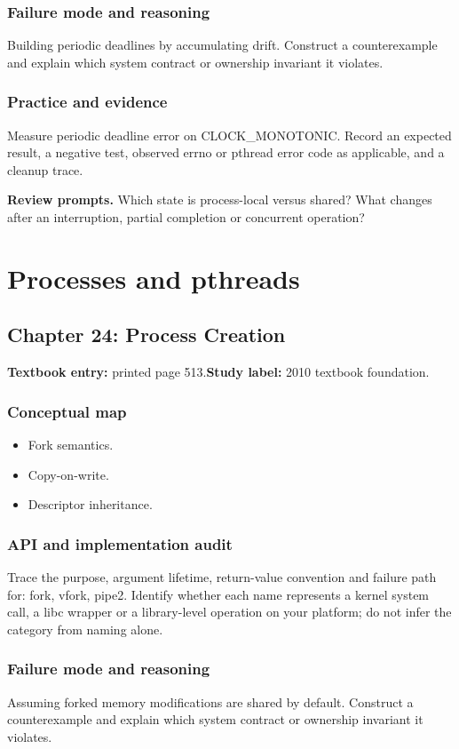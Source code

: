 \documentclass[11pt,letterpaper,oneside]{report}
\begin{document}
\subsection{Failure mode and reasoning}
Building periodic deadlines by accumulating drift. Construct a counterexample and explain which system contract or ownership invariant it violates.

\subsection{Practice and evidence}
Measure periodic deadline error on CLOCK\_MONOTONIC. Record an expected result, a negative test, observed errno or pthread error code as applicable, and a cleanup trace.

\textbf{Review prompts.} Which state is process-local versus shared? What changes after an interruption, partial completion or concurrent operation?

\chapter{Processes and pthreads}
\section{Chapter 24: Process Creation}
\textbf{Textbook entry:} printed page 513.\quad \textbf{Study label:} 2010 textbook foundation.

\subsection{Conceptual map}
\begin{itemize}
\item Fork semantics.
\item Copy-on-write.
\item Descriptor inheritance.
\end{itemize}
\subsection{API and implementation audit}
Trace the purpose, argument lifetime, return-value convention and failure path for: fork, vfork, pipe2. Identify whether each name represents a kernel system call, a libc wrapper or a library-level operation on your platform; do not infer the category from naming alone.

\subsection{Failure mode and reasoning}
Assuming forked memory modifications are shared by default. Construct a counterexample and explain which system contract or ownership invariant it violates.
\end{document}
